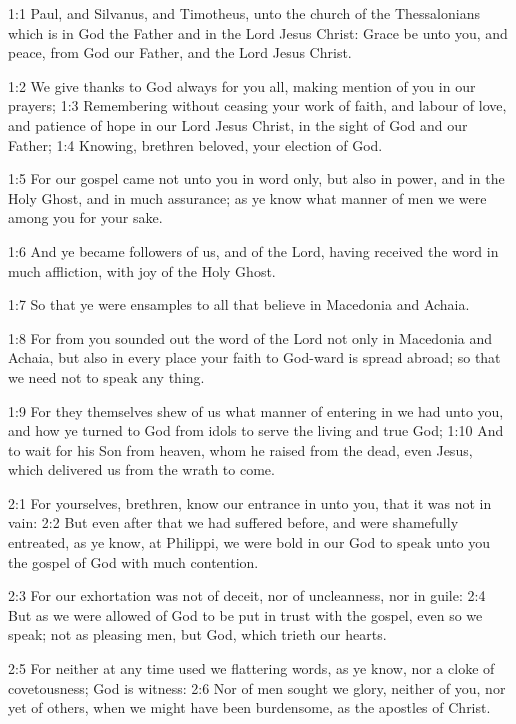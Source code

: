 

1:1 Paul, and Silvanus, and Timotheus, unto the church of the Thessalonians which is in God the Father and in the Lord Jesus Christ: Grace be unto you, and peace, from God our Father, and the Lord Jesus Christ.

1:2 We give thanks to God always for you all, making mention of you in our prayers; 1:3 Remembering without ceasing your work of faith, and labour of love, and patience of hope in our Lord Jesus Christ, in the sight of God and our Father; 1:4 Knowing, brethren beloved, your election of God.

1:5 For our gospel came not unto you in word only, but also in power, and in the Holy Ghost, and in much assurance; as ye know what manner of men we were among you for your sake.

1:6 And ye became followers of us, and of the Lord, having received the word in much affliction, with joy of the Holy Ghost.

1:7 So that ye were ensamples to all that believe in Macedonia and Achaia.

1:8 For from you sounded out the word of the Lord not only in Macedonia and Achaia, but also in every place your faith to God-ward is spread abroad; so that we need not to speak any thing.

1:9 For they themselves shew of us what manner of entering in we had unto you, and how ye turned to God from idols to serve the living and true God; 1:10 And to wait for his Son from heaven, whom he raised from the dead, even Jesus, which delivered us from the wrath to come.

2:1 For yourselves, brethren, know our entrance in unto you, that it was not in vain: 2:2 But even after that we had suffered before, and were shamefully entreated, as ye know, at Philippi, we were bold in our God to speak unto you the gospel of God with much contention.

2:3 For our exhortation was not of deceit, nor of uncleanness, nor in guile: 2:4 But as we were allowed of God to be put in trust with the gospel, even so we speak; not as pleasing men, but God, which trieth our hearts.

2:5 For neither at any time used we flattering words, as ye know, nor a cloke of covetousness; God is witness: 2:6 Nor of men sought we glory, neither of you, nor yet of others, when we might have been burdensome, as the apostles of Christ.


